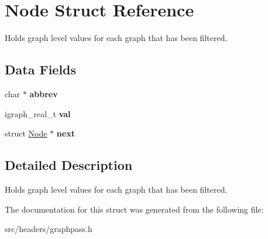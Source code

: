 \hypertarget{struct_node}{}\section{Node Struct Reference}
\label{struct_node}


Holds graph level values for each graph that has been filtered.  


\subsection*{Data Fields}
\begin{DoxyCompactItemize}
\item 
\mbox{\label{struct_node_a178c16b0a92c53ed7c1f4722db90a876}} 
char $\ast$ {\bfseries abbrev}
\item 
\mbox{\label{struct_node_ab4a7695864395a8fc4ee1182952ed4f4}} 
igraph\+\_\+real\+\_\+t {\bfseries val}
\item 
\mbox{\label{struct_node_aa162dd1e0693188a22b1f13b9a2a0ef0}} 
struct \hyperlink{struct_node}{Node} $\ast$ {\bfseries next}
\end{DoxyCompactItemize}


\subsection{Detailed Description}
Holds graph level values for each graph that has been filtered. 

The documentation for this struct was generated from the following file\+:\begin{DoxyCompactItemize}
\item 
src/headers/graphpass.\+h\end{DoxyCompactItemize}
